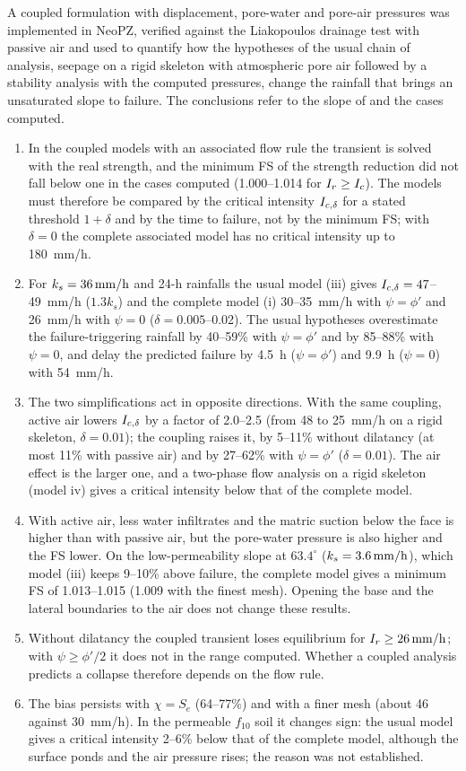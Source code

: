 A coupled formulation with displacement, pore-water and pore-air pressures was implemented in NeoPZ, verified against
the Liakopoulos drainage test with passive air and used to quantify how the hypotheses of the usual chain of
analysis, seepage on a rigid skeleton with atmospheric pore air followed by a stability analysis with the computed
pressures, change the rainfall that brings an unsaturated slope to failure. The conclusions refer to the slope of
\citet{rahardjo2007} and the cases computed.
\begin{enumerate}
\item In the coupled models with an associated flow rule the transient is solved with the real strength, and the
minimum FS of the strength reduction did not fall below one in the cases computed (1.000--1.014 for $I_r\ge I_c$). The models must
therefore be compared by the critical intensity $I_{c,\delta}$ for a stated threshold $1+\delta$ and by the time to failure,
not by the minimum FS; with $\delta=0$ the complete associated model has no critical intensity up to 180~mm/h.
\item For $k_s=36\,\mathrm{mm/h}$ and 24-h rainfalls the usual model (iii) gives $I_{c,\delta}=47$--49~mm/h ($1.3k_s$) and the complete
model (i) 30--35~mm/h with $\psi=\phi'$ and 26~mm/h with $\psi=0$ ($\delta=0.005$--0.02). The usual hypotheses
overestimate the failure-triggering rainfall by 40--59\% with $\psi=\phi'$ and by 85--88\% with $\psi=0$, and delay
the predicted failure by 4.5~h ($\psi=\phi'$) and 9.9~h ($\psi=0$) with 54~mm/h.
\item The two simplifications act in opposite directions. With the same coupling, active air lowers $I_{c,\delta}$ by a
factor of 2.0--2.5 (from 48 to 25~mm/h on a rigid skeleton, $\delta=0.01$); the coupling raises it, by
5--11\% without dilatancy (at most 11\% with passive air) and by 27--62\% with $\psi=\phi'$ ($\delta=0.01$). The air effect is the larger
one, and a two-phase flow analysis on a rigid skeleton (model iv) gives a critical intensity below that of the
complete model.
\item With active air, less water infiltrates and the matric suction below the face is higher than with passive air,
but the pore-water pressure is also higher and the FS lower. On the low-permeability slope at $63.4^\circ$
($k_s=3.6\,\mathrm{mm/h}$), which model (iii) keeps 9--10\% above failure, the complete model gives a minimum FS of 1.013--1.015
(1.009 with the finest mesh). Opening the base and the lateral boundaries to the air does not change these results.
\item Without dilatancy the coupled transient loses equilibrium for $I_r\ge26\,\mathrm{mm/h}$; with $\psi\ge\phi'/2$ it does not
in the range computed. Whether a coupled analysis predicts a collapse therefore depends on the flow rule.
\item The bias persists with $\chi=S_e$ (64--77\%) and with a finer mesh (about 46 against 30~mm/h). In the
permeable $f_{10}$ soil it changes sign: the usual model gives a critical intensity 2--6\% below that of the complete
model, although the surface ponds and the air pressure rises; the reason was not established.
\end{enumerate}
